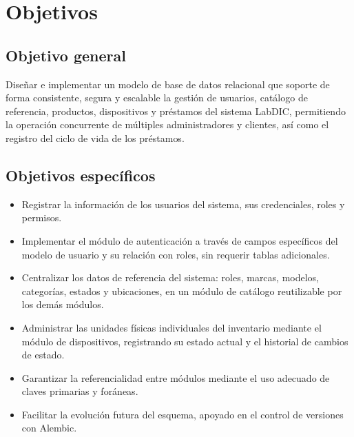 \section{Objetivos}

\subsection{Objetivo general}

Diseñar e implementar un modelo de base de datos relacional que soporte de forma 
consistente, segura y escalable la gestión de usuarios, catálogo de referencia, 
productos, dispositivos y préstamos del sistema LabDIC, permitiendo la operación 
concurrente de múltiples administradores y clientes, así como el registro del ciclo 
de vida de los préstamos.

\subsection{Objetivos específicos}

\begin{itemize}
	\item Registrar la información de los usuarios del sistema, sus credenciales, roles 
	y permisos.
	
	\item Implementar el módulo de autenticación a través de campos específicos del 
	modelo de usuario y su relación con roles, sin requerir tablas adicionales.
	
	\item Centralizar los datos de referencia del sistema: roles, marcas, modelos, 
	categorías, estados y ubicaciones, en un módulo de catálogo reutilizable por los 
	demás módulos.
	
	\item Administrar las unidades físicas individuales del inventario mediante el módulo 
	de dispositivos, registrando su estado actual y el historial de cambios de estado.
	
	\item Garantizar la referencialidad entre módulos mediante el uso adecuado de 
	claves primarias y foráneas.
	
	\item Facilitar la evolución futura del esquema, apoyado en el control de versiones con Alembic.
\end{itemize}